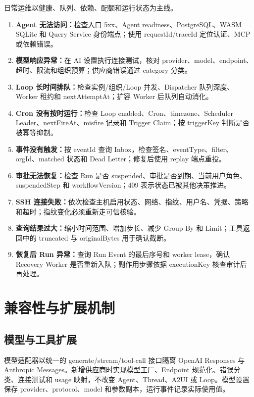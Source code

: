 \documentclass[conference,10pt]{IEEEtran}
\begin{document}
日常运维以健康、队列、依赖、配额和运行状态为主线。

\begin{enumerate}
  \item \textbf{Agent 无法访问：}检查入口 5xx、Agent readiness、PostgreSQL、WASM SQLite 和 Query Service 身份端点；使用 requestId/traceId 定位认证、MCP 或依赖错误。
  \item \textbf{模型响应异常：}在 AI 设置执行连接测试，核对 provider、model、endpoint、超时、限流和组织预算；供应商错误通过 category 分类。
  \item \textbf{Loop 长时间排队：}检查实例/组织/Loop 并发、Dispatcher 队列深度、Worker 租约和 nextAttemptAt；扩容 Worker 后队列自动消化。
  \item \textbf{Cron 没有按时运行：}检查 Loop enabled、Cron、timezone、Scheduler Leader、nextFireAt、misfire 记录和 Trigger Claim；按 triggerKey 判断是否被幂等抑制。
  \item \textbf{事件没有触发：}按 eventId 查询 Inbox，检查签名、eventType、filter、orgId、matched 状态和 Dead Letter；修复后使用 replay 端点重投。
  \item \textbf{审批无法恢复：}检查 Run 是否 suspended、审批是否到期、当前用户角色、suspendedStep 和 workflowVersion；409 表示状态已被其他决策推进。
  \item \textbf{SSH 连接失败：}依次检查主机启用状态、网络、指纹、用户名、凭据、策略和超时；指纹变化必须重新走可信核验。
  \item \textbf{查询结果过大：}缩小时间范围、增加步长、减少 Group By 和 Limit；工具返回中的 truncated 与 originalBytes 用于确认截断。
  \item \textbf{恢复后 Run 异常：}查询 Run Event 的最后序号和 worker lease，确认 Recovery Worker 是否重新入队；副作用步骤依据 executionKey 核查审计后再处理。
\end{enumerate}

\section{兼容性与扩展机制}

\subsection{模型与工具扩展}

模型适配器以统一的 generate/stream/tool-call 接口隔离 OpenAI Responses 与 Anthropic Messages。新增供应商时实现模型工厂、Endpoint 规范化、错误分类、连接测试和 usage 映射，不改变 Agent、Thread、A2UI 或 Loop。模型设置保存 provider、protocol、model 和参数副本，运行事件记录实际使用值。
\end{document}

